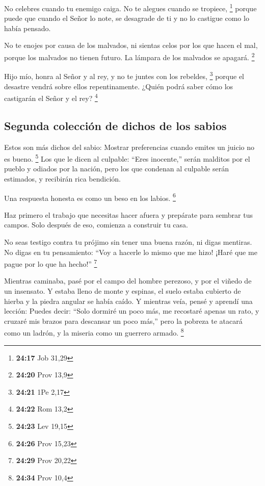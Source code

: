  No celebres cuando tu enemigo caiga. No te alegues cuando
se tropiece, \footnote{\textbf{24:17} Job 31,29}  porque
puede que cuando el Señor lo note, se desagrade de ti y no lo castigue
como lo había pensado.

 No te enojes por causa de los malvados, ni sientas celos
por los que hacen el mal,  porque los malvados no tienen
futuro. La lámpara de los malvados se apagará. \footnote{\textbf{24:20}
  Prov 13,9}

 Hijo mío, honra al Señor y al rey, y no te juntes con los
rebeldes, \footnote{\textbf{24:21} 1Pe 2,17}  porque el
desastre vendrá sobre ellos repentinamente. ¿Quién podrá saber cómo los
castigarán el Señor y el rey? \footnote{\textbf{24:22} Rom 13,2}

\hypertarget{segunda-colecciuxf3n-de-dichos-de-los-sabios}{%
\subsection{Segunda colección de dichos de los
sabios}\label{segunda-colecciuxf3n-de-dichos-de-los-sabios}}

 Estos son más dichos del sabio: Mostrar preferencias
cuando emites un juicio no es bueno. \footnote{\textbf{24:23} Lev 19,15}
 Los que le dicen al culpable: ``Eres inocente,'' serán
malditos por el pueblo y odiados por la nación,  pero los
que condenan al culpable serán estimados, y recibirán rica bendición.

 Una respuesta honesta es como un beso en los labios.
\footnote{\textbf{24:26} Prov 15,23}

 Haz primero el trabajo que necesitas hacer afuera y
prepárate para sembrar tus campos. Solo después de eso, comienza a
construir tu casa.

 No seas testigo contra tu prójimo sin tener una buena
razón, ni digas mentiras.  No digas en tu pensamiento:
``Voy a hacerle lo mismo que me hizo! ¡Haré que me pague por lo que ha
hecho!'' \footnote{\textbf{24:29} Prov 20,22}

 Mientras caminaba, pasé por el campo del hombre perezoso,
y por el viñedo de un insensato.  Y estaba lleno de monte y
espinas, el suelo estaba cubierto de hierba y la piedra angular se había
caído.  Y mientras veía, pensé y aprendí una lección:
 Puedes decir: ``Solo dormiré un poco más, me recostaré
apenas un rato, y cruzaré mis brazos para descansar un poco más,''
 pero la pobreza te atacará como un ladrón, y la miseria
como un guerrero armado. \footnote{\textbf{24:34} Prov 10,4}

